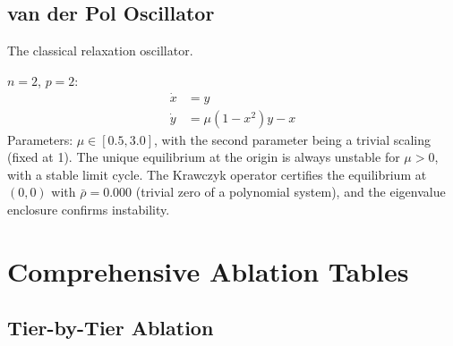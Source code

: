 \documentclass[11pt]{article}
\begin{document}
\subsection{van der Pol Oscillator~\cite{vanderpol1926}}

The classical relaxation oscillator.

$n=2$, $p=2$:
\begin{align*}
\dot{x} &= y \\
\dot{y} &= \mu(1 - x^2)y - x
\end{align*}
Parameters: $\mu \in [0.5, 3.0]$, with the second parameter being a trivial scaling (fixed at 1).
The unique equilibrium at the origin is always unstable for $\mu > 0$, with a stable limit cycle.
The Krawczyk operator certifies the equilibrium at $(0, 0)$ with $\bar\rho = 0.000$ (trivial zero of a polynomial system), and the eigenvalue enclosure confirms instability.

\section{Comprehensive Ablation Tables}
\label{app:ablation}

\subsection{Tier-by-Tier Ablation}
\end{document}
